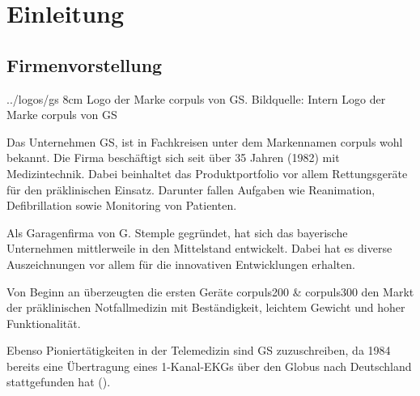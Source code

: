 \chapter{Einleitung}
\label{einleitung}
\minitoc\pagebreak


\section{Firmenvorstellung}
\bild
{../logos/gs}
{8cm}
{Logo der Marke \glqq corpuls\grqq{} von \acrlong*{GS}. Bildquelle: Intern}
{Logo der Marke \glqq corpuls\grqq{} von GS}

Das Unternehmen \gls{GS}, ist in Fachkreisen unter dem Markennamen \glqq corpuls\grqq{} wohl bekannt. 
Die Firma beschäftigt sich seit über 35 Jahren (1982) mit Medizintechnik.
Dabei beinhaltet das Produktportfolio vor allem Rettungsgeräte für den präklinischen Einsatz.
Darunter fallen Aufgaben wie Reanimation, Defibrillation sowie Monitoring von Patienten. 

Als Garagenfirma von G. Stemple gegründet, hat sich das bayerische Unternehmen mittlerweile in den Mittelstand entwickelt.
Dabei hat es diverse Auszeichnungen vor allem für die innovativen Entwicklungen erhalten.

Von Beginn an überzeugten die ersten Geräte corpuls200 \& corpuls300 den Markt der präklinischen Notfallmedizin mit Beständigkeit, leichtem Gewicht und hoher Funktionalität. 

Ebenso Pioniertätigkeiten in der Telemedizin sind \gls{GS} zuzuschreiben, da 1984 bereits eine Übertragung eines 1-Kanal-EKGs über den Globus nach Deutschland stattgefunden hat ().

